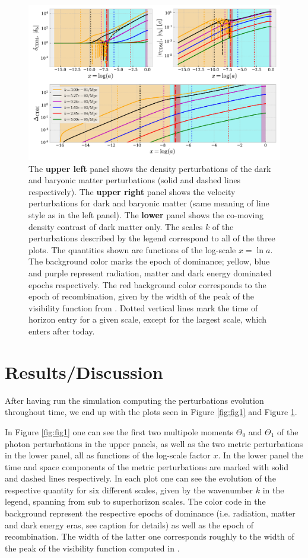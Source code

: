 \documentclass[twocolumn]{aastex62}
\begin{document}
\begin{figure}
    \includegraphics[scale = 0.65]{Figures/fig2.pdf}
    \caption{The \textbf{upper left} panel shows the density perturbations of the dark and baryonic matter perturbations (solid and dashed lines respectively). The \textbf{upper right} panel shows the velocity perturbations for dark and baryonic matter (same meaning of line style as in the left panel). The \textbf{lower} panel shows the co-moving density contrast of dark matter only. The scales $k$ of the perturbations described by the legend correspond to all of the three plots. The quantities shown are functions of the log-scale $x = \ln a$.  The background color marks the epoch of dominance; yellow, blue and purple represent radiation, matter and dark energy dominated epochs respectively. The red background color corresponds to the epoch of recombination, given by the width of the peak of the visibility function from \cite{stutzer:2020b}. Dotted vertical lines mark the time of horizon entry for a given scale, except for the largest scale, which enters after today.}
    \label{fig:fig2}
\end{figure}


\section{Results/Discussion}\label{sec:Results}

After having run the simulation computing the perturbations evolution throughout time, we end up with the plots seen in Figure \ref{fig:fig1} and Figure \ref{fig:fig2}.

In Figure \ref{fig:fig1} one can see the first two multipole moments $\Theta_0$ and $\Theta_1$ of the photon perturbations in the upper panels, as well as the two metric perturbations in the lower panel, all as functions of the log-scale factor $x$. In the lower panel the time and space components of the metric perturbations are marked with solid and dashed lines respectively. In each plot one can see the evolution of the respective quantity for six different scales, given by the wavenumber $k$ in the legend, spanning from sub to superhorizon scales. The color code in the background represent the respective epochs of dominance (i.e. radiation, matter and dark energy eras, see caption for details) as well as the epoch of recombination. The width of the latter one corresponds roughly to the width of the peak of the visibility function computed in \cite{stutzer:2020b}. 
\end{document}
